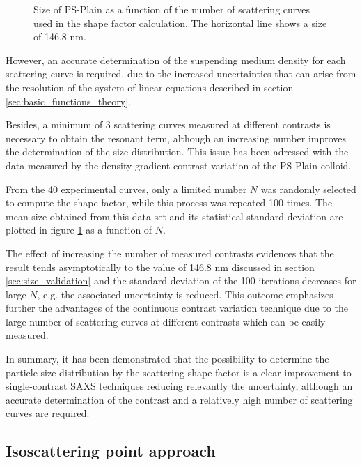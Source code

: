 \begin{figure}
	\begin{center}
		
	\end{center}
\caption[Size of PS-Plain obtained from the shape factor as a function of the number of scattering curves.]{Size of PS-Plain as a function of the number of scattering curves used in the shape factor calculation. The horizontal line shows a size of 146.8 nm.}
\label{fig:ResonantTermSimulationNumber}
\end{figure}

However, an accurate determination of the suspending medium density for each scattering curve is required, due to the increased uncertainties\citep{lefebvre_propagation_2000} that can arise from the resolution of the system of linear equations described in section \ref{sec:basic_functions_theory}.

Besides, a minimum of 3 scattering curves measured at different contrasts is necessary to obtain the resonant term, although an increasing number improves the determination of the size distribution. This issue has been adressed with the data measured by the density gradient contrast variation of the PS-Plain colloid. 

From the 40 experimental curves, only a limited number $N$ was randomly selected to compute the shape factor, while this process was repeated 100 times. The mean size obtained from this data set and its statistical standard deviation are plotted in figure \ref{fig:ResonantTermSimulationNumber} as a function of $N$.

The effect of increasing the number of measured contrasts evidences that the result tends asymptotically to the value of 146.8 nm discussed in section \ref{sec:size_validation} and the standard deviation of the 100 iterations decreases for large $N$, e.g. the associated uncertainty is reduced. This outcome emphasizes further the advantages of the continuous contrast variation technique due to the large number of scattering curves at different contrasts which can be easily measured.

In summary, it has been demonstrated that the possibility to determine the particle size distribution by the scattering shape factor is a clear improvement to single-contrast SAXS techniques reducing relevantly the uncertainty, although an accurate determination of the contrast and a relatively high number of scattering curves are required. 

\subsection{Isoscattering point approach}

